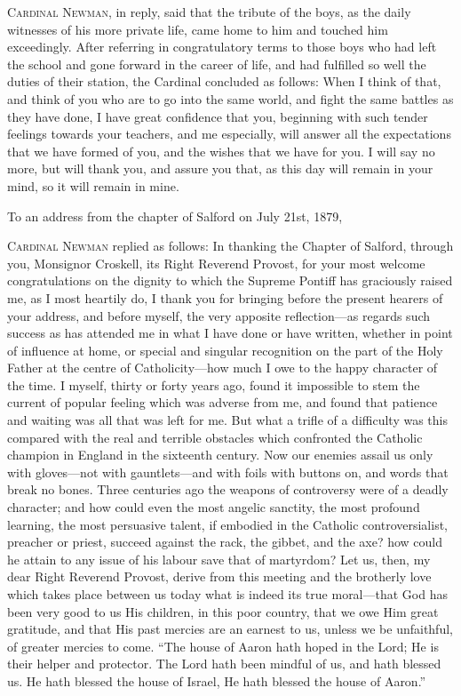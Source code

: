 C\textsc{ardinal} N\textsc{ewman},
in reply, said that the tribute of the boys, as the daily witnesses of
his more private life, came home to him and touched him exceedingly.
After referring in congratulatory terms to those boys who had left the
school and gone forward in the career of life, and had fulfilled so
well the duties of their station, the Cardinal concluded as
follows: When I think of that, and think of you who are to go into the
same world, and fight the same battles as they have done, I have great
confidence that you, beginning with such tender feelings towards your
teachers, and me especially, will answer all the expectations that we
have formed of you, and the wishes that we have for you. I will say no
more, but will thank you, and assure you that, as this day will remain
in your mind, so it will remain in mine.


To an address from the chapter of Salford on July
21st, 1879,

C\textsc{ardinal} N\textsc{ewman}
replied as follows: In thanking the Chapter of Salford, through you,
Monsignor Croskell, its Right Reverend Provost, for your most welcome
congratulations on the dignity to which the Supreme Pontiff has
graciously raised me, as I most heartily do, I thank you for bringing
before the present hearers of your address, and before myself, the
very apposite reflection—as regards such success as has attended me
in what I have done or have written, whether in point of influence at
home, or special and singular recognition on the part of the Holy
Father at the centre of Catholicity—how much I owe to the happy
character of the time. I myself, thirty or forty years ago, found it
impossible to stem the current of popular feeling which was adverse
from me, and found that patience and waiting was all that was left for
me. But what a trifle of a difficulty was this compared with the real
and terrible obstacles which confronted the Catholic champion in
England in the sixteenth century. Now our enemies assail us only with
gloves—not with gauntlets—and with foils with buttons on, and
words that break no bones. Three centuries ago the weapons of
controversy were of a deadly character; and how could even the most
angelic sanctity, the most profound learning, the most persuasive
talent, if embodied in the Catholic controversialist, preacher or
priest, succeed against the rack, the gibbet, and the axe? how could
he attain to any issue of his labour save that of martyrdom? Let us,
then, my dear Right Reverend Provost, derive from this meeting and the
brotherly love which takes place between us today what is indeed its
true moral—that God has been very good to us His children, in this poor country, that we owe Him great gratitude, and that His past
mercies are an earnest to us, unless we be unfaithful, of greater
mercies to come. ``The house of Aaron hath hoped in the Lord; He is
their helper and protector. The Lord hath been mindful of us, and hath
blessed us. He hath blessed the house of Israel, He hath blessed the
house of Aaron.''

